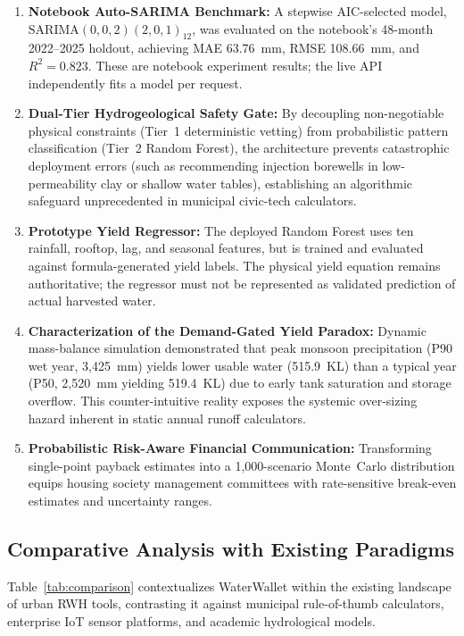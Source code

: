 ﻿\documentclass[conference]{IEEEtran}
\begin{document}
\begin{enumerate}
  \item \textbf{Notebook Auto-SARIMA Benchmark:} A stepwise AIC-selected model, $\mathrm{SARIMA}(0,0,2)(2,0,1)_{12}$, was evaluated on the notebook's 48-month 2022--2025 holdout, achieving MAE 63.76~mm, RMSE 108.66~mm, and $R^2=0.823$. These are notebook experiment results; the live API independently fits a model per request.
  
  \item \textbf{Dual-Tier Hydrogeological Safety Gate:} By decoupling non-negotiable physical constraints (Tier~1 deterministic vetting) from probabilistic pattern classification (Tier~2 Random Forest), the architecture prevents catastrophic deployment errors (such as recommending injection borewells in low-permeability clay or shallow water tables), establishing an algorithmic safeguard unprecedented in municipal civic-tech calculators.
  
  \item \textbf{Prototype Yield Regressor:} The deployed Random Forest uses ten rainfall, rooftop, lag, and seasonal features, but is trained and evaluated against formula-generated yield labels. The physical yield equation remains authoritative; the regressor must not be represented as validated prediction of actual harvested water.
  
  \item \textbf{Characterization of the Demand-Gated Yield Paradox:} Dynamic mass-balance simulation demonstrated that peak monsoon precipitation (P90 wet year, 3,425~mm) yields lower usable water (515.9~KL) than a typical year (P50, 2,520~mm yielding 519.4~KL) due to early tank saturation and storage overflow. This counter-intuitive reality exposes the systemic over-sizing hazard inherent in static annual runoff calculators.
  
  \item \textbf{Probabilistic Risk-Aware Financial Communication:} Transforming single-point payback estimates into a 1,000-scenario Monte~Carlo distribution equips housing society management committees with rate-sensitive break-even estimates and uncertainty ranges.
\end{enumerate}

\subsection{Comparative Analysis with Existing Paradigms}

Table~\ref{tab:comparison} contextualizes WaterWallet within the existing landscape of urban RWH tools, contrasting it against municipal rule-of-thumb calculators, enterprise IoT sensor platforms, and academic hydrological models.
\end{document}
